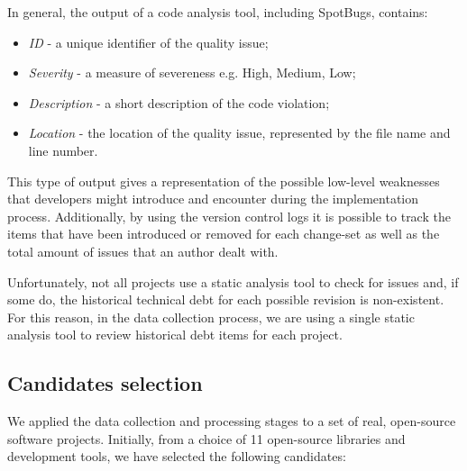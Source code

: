 \documentclass{mpaper}
\begin{document}
In general, the output of a code analysis tool, including SpotBugs, contains:
\begin{itemize}
  \item \emph{ID} - a unique identifier of the quality issue;
  \item \emph{Severity} - a measure of severeness e.g. High, Medium, Low;
  \item \emph{Description} - a short description of the code violation;
  \item \emph{Location} - the location of the quality issue, represented by the
  file name and line number. 
\end{itemize}

This type of output gives a representation of the possible low-level weaknesses
that developers might introduce and encounter during the implementation process.
Additionally, by using the version control logs it is possible to track the
items that have been introduced or removed for each change-set as well as the
total amount of issues that an author dealt with. 

Unfortunately, not all projects use a static analysis tool to check for issues
and, if some do, the historical technical debt for each possible revision is
non-existent. For this reason, in the data collection process, we are using a
single static analysis tool to review historical debt items for each project.

\subsection{Candidates selection}
\label{data-selection}

We applied the data collection and processing stages to a set of real,
open-source software projects. Initially, from a choice of 11 open-source
libraries and development tools, we have selected the following candidates: 
\end{document}
